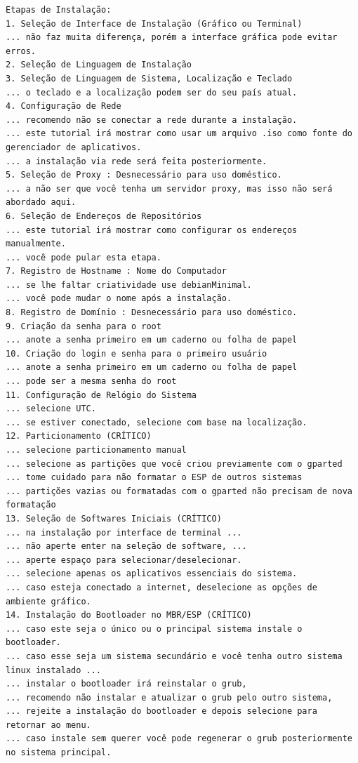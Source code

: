 \documentclass[12pt,a4paper]{article}
\begin{document}
\begin{lstlisting}
Etapas de Instalação:
1. Seleção de Interface de Instalação (Gráfico ou Terminal)
... não faz muita diferença, porém a interface gráfica pode evitar erros.
2. Seleção de Linguagem de Instalação
3. Seleção de Linguagem de Sistema, Localização e Teclado
... o teclado e a localização podem ser do seu país atual.
4. Configuração de Rede 
... recomendo não se conectar a rede durante a instalação. 
... este tutorial irá mostrar como usar um arquivo .iso como fonte do gerenciador de aplicativos.
... a instalação via rede será feita posteriormente.
5. Seleção de Proxy : Desnecessário para uso doméstico. 
... a não ser que você tenha um servidor proxy, mas isso não será abordado aqui.
6. Seleção de Endereços de Repositórios
... este tutorial irá mostrar como configurar os endereços manualmente.
... você pode pular esta etapa.
7. Registro de Hostname : Nome do Computador 
... se lhe faltar criatividade use debianMinimal.
... você pode mudar o nome após a instalação.
8. Registro de Domínio : Desnecessário para uso doméstico. 
9. Criação da senha para o root 
... anote a senha primeiro em um caderno ou folha de papel
10. Criação do login e senha para o primeiro usuário 
... anote a senha primeiro em um caderno ou folha de papel
... pode ser a mesma senha do root
11. Configuração de Relógio do Sistema 
... selecione UTC.
... se estiver conectado, selecione com base na localização.
12. Particionamento (CRÍTICO)
... selecione particionamento manual 
... selecione as partições que você criou previamente com o gparted
... tome cuidado para não formatar o ESP de outros sistemas
... partições vazias ou formatadas com o gparted não precisam de nova formatação
13. Seleção de Softwares Iniciais (CRÍTICO)
... na instalação por interface de terminal ...
... não aperte enter na seleção de software, ... 
... aperte espaço para selecionar/deselecionar.
... selecione apenas os aplicativos essenciais do sistema.
... caso esteja conectado a internet, deselecione as opções de ambiente gráfico.
14. Instalação do Bootloader no MBR/ESP (CRÍTICO)
... caso este seja o único ou o principal sistema instale o bootloader.
... caso esse seja um sistema secundário e você tenha outro sistema linux instalado ...
... instalar o bootloader irá reinstalar o grub,
... recomendo não instalar e atualizar o grub pelo outro sistema,
... rejeite a instalação do bootloader e depois selecione para retornar ao menu.
... caso instale sem querer você pode regenerar o grub posteriormente no sistema principal.
\end{lstlisting}
\end{document}
